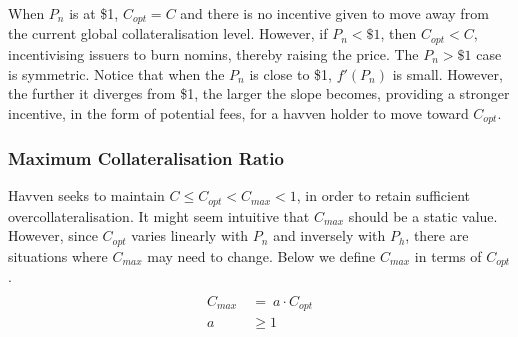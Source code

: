 \noindent When $P_n$ is at \$1, $C_{opt} = C$ and there is no incentive given to move away from the current global collateralisation level. However, if $P_n < \$1$, then $C_{opt} < C$, incentivising issuers to burn nomins, thereby raising the price. The $P_n > \$1$ case is symmetric. Notice that when the $P_n$ is close to \$1, $ f'(P_n) $ is small. However, the further it diverges from \$1, the larger the slope becomes, providing a stronger incentive, in the form of potential fees, for a havven holder to move toward $C_{opt}$. \\

\newpage

\subsubsection{Maximum Collateralisation Ratio}

\noindent Havven seeks to maintain $C \leq C_{opt} < C_{max} < 1$, in order to retain sufficient overcollateralisation. It might seem intuitive that $C_{max}$ should be a static value. However, since $C_{opt}$ varies linearly with $P_n$ and inversely with $P_h$,  there are situations where $C_{max}$ may need to change. Below we define $C_{max}$ in terms of $C_{opt}$. \\

\begin{gather} \label{eq:maxcollateralisation}
\begin{align}
\begin{split}
C_{max} \ &= \ a \cdot C_{opt} \\ 
a & \geq 1 \\
\end{split}
\end{align}
\end{gather}

\begin{center}
\end{center}

